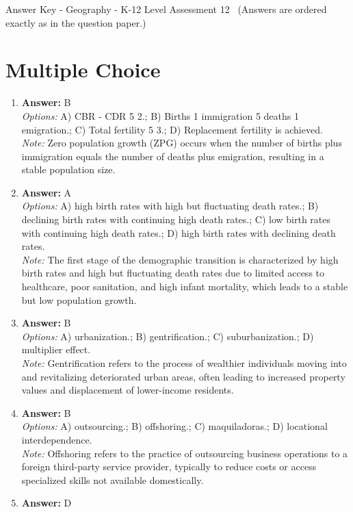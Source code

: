 \documentclass[12pt]{article}
\begin{document}
\begin{center}
Answer Key - Geography - K-12 Level Assessment 12 \
\small (Answers are ordered exactly as in the question paper.)
\end{center}

\section*{Multiple Choice}
\begin{enumerate}[label=\arabic*.]
\item \textbf{Answer:} B
\\ \textit{Options:} A) CBR - CDR 5 2.; B) Births 1 immigration 5 deaths 1 emigration.; C) Total fertility 5 3.; D) Replacement fertility is achieved.
\\ \textit{Note:} Zero population growth (ZPG) occurs when the number of births plus immigration equals the number of deaths plus emigration, resulting in a stable population size.
\item \textbf{Answer:} A
\\ \textit{Options:} A) high birth rates with high but fluctuating death rates.; B) declining birth rates with continuing high death rates.; C) low birth rates with continuing high death rates.; D) high birth rates with declining death rates.
\\ \textit{Note:} The first stage of the demographic transition is characterized by high birth rates and high but fluctuating death rates due to limited access to healthcare, poor sanitation, and high infant mortality, which leads to a stable but low population growth.
\item \textbf{Answer:} B
\\ \textit{Options:} A) urbanization.; B) gentrification.; C) suburbanization.; D) multiplier effect.
\\ \textit{Note:} Gentrification refers to the process of wealthier individuals moving into and revitalizing deteriorated urban areas, often leading to increased property values and displacement of lower-income residents.
\item \textbf{Answer:} B
\\ \textit{Options:} A) outsourcing.; B) offshoring.; C) maquiladoras.; D) locational interdependence.
\\ \textit{Note:} Offshoring refers to the practice of outsourcing business operations to a foreign third-party service provider, typically to reduce costs or access specialized skills not available domestically.
\item \textbf{Answer:} D

\end{enumerate}
\end{document}
